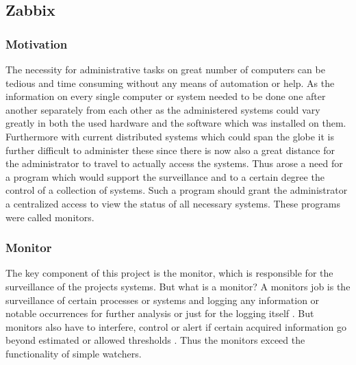 \subsection{Zabbix}

\subsubsection{Motivation}
	The necessity for administrative tasks on great number of computers can be tedious and time consuming without any means of automation or help. As the information on every single computer or system needed to be done one after another separately from each other as the administered systems could vary greatly in both the used hardware and the software which was installed on them. Furthermore with current distributed systems which could span the globe it is further difficult to administer these since there is now also a great distance for the administrator to travel to actually access the systems. Thus arose a need for a program which would support the surveillance and to a certain degree the control of a collection of systems. Such a program should grant the administrator a centralized access to view the status of all necessary systems. These programs were called monitors.
\subsubsection{Monitor}
	The key component of this project is the monitor, which is responsible for the surveillance of the projects systems. But what is a monitor? A monitors job is the surveillance of certain processes or systems and logging any information or notable occurrences for further analysis or just for the logging itself \cite{zab1}. But monitors also have to interfere, control or alert if certain acquired information go beyond estimated or allowed thresholds \cite{zab1}. Thus the monitors exceed the functionality of simple watchers.
